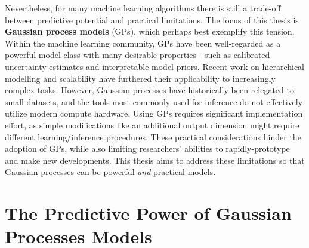 Nevertheless, for many machine learning algorithms there is still a trade-off between predictive potential and practical limitations.
The focus of this thesis is {\bf Gaussian process models} (GPs), which perhaps best exemplify this tension.
Within the machine learning community, GPs have been well-regarded as a powerful model class with many desirable properties---such as calibrated uncertainty estimates and interpretable model priors.
Recent work on hierarchical modelling \citep[e.g.][]{damianou2013deep} and scalability \citep[e.g.][]{wilson2015kernel} have furthered their applicability to increasingly complex tasks.
However, Gaussian processes have historically been relegated to small datasets, and the tools most commonly used for inference do not effectively utilize modern compute hardware.
Using GPs requires significant implementation effort, as simple modifications like an additional output dimension might require different learning/inference procedures.
These practical considerations hinder the adoption of GPs, while also limiting researchers' abilities to rapidly-prototype and make new developments.
This thesis aims to address these limitations so that Gaussian processes can be powerful-\emph{and}-practical models.


\section{The Predictive Power of Gaussian Processes Models}

